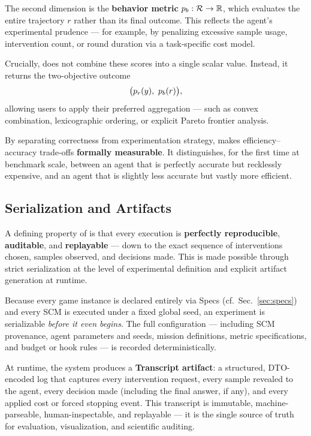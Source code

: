 The second dimension is the \textbf{behavior metric} $\behaviormetric : \runs \rightarrow \mathbb{R}$, which evaluates the entire trajectory $r$ rather than its final outcome. This reflects the agent’s experimental prudence — for example, by penalizing excessive sample usage, intervention count, or round duration via a task-specific cost model.

Crucially, \game does not combine these scores into a single scalar value. Instead, it returns the two-objective outcome
\[
    \big( p_r(y),\ p_b(r) \big),
\]
allowing users to apply their preferred aggregation — such as convex combination, lexicographic ordering, or explicit Pareto frontier analysis.

By separating correctness from experimentation strategy, \game makes efficiency–accuracy trade-offs \textbf{formally measurable}. It distinguishes, for the first time at benchmark scale, between an agent that is perfectly accurate but recklessly expensive, and an agent that is slightly less accurate but vastly more efficient.

\subsection{Serialization and Artifacts}
\label{sec:serialization}
A defining property of \game is that every execution is \textbf{perfectly reproducible}, \textbf{auditable}, and \textbf{replayable} — down to the exact sequence of interventions chosen, samples observed, and decisions made. This is made possible through strict serialization at the level of experimental definition and explicit artifact generation at runtime.

Because every game instance is declared entirely via Specs (cf.\ Sec.~\ref{sec:specs}) and every SCM is executed under a fixed global seed, an experiment is serializable \emph{before it even begins}. The full configuration — including SCM provenance, agent parameters and seeds, mission definitions, metric specifications, and budget or hook rules — is recorded deterministically.

At runtime, the system produces a \textbf{Transcript artifact}: a structured, DTO-encoded log that captures every intervention request, every sample revealed to the agent, every decision made (including the final answer, if any), and every applied cost or forced stopping event. This transcript is immutable, machine-parseable, human-inspectable, and replayable — it is the single source of truth for evaluation, visualization, and scientific auditing.

